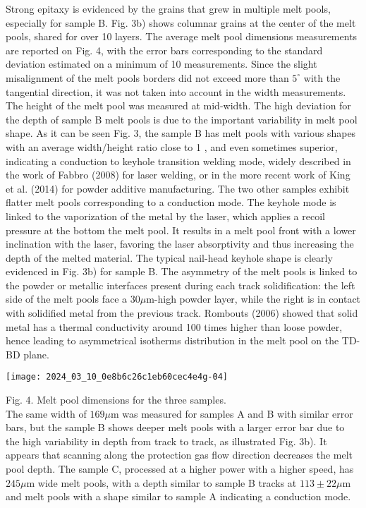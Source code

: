 \documentclass[10pt]{article}
\begin{document}
Strong epitaxy is evidenced by the grains that grew in multiple melt pools, especially for sample B. Fig. 3b) shows columnar grains at the center of the melt pools, shared for over 10 layers. The average melt pool dimensions measurements are reported on Fig. 4, with the error bars corresponding to the standard deviation estimated on a minimum of 10 measurements. Since the slight misalignment of the melt pools borders did not exceed more than $5^{\circ}$ with the tangential direction, it was not taken into account in the width measurements. The height of the melt pool was measured at mid-width. The high deviation for the depth of sample B melt pools is due to the important variability in melt pool shape. As it can be seen Fig. 3, the sample B has melt pools with various shapes with an average width/height ratio close to 1 , and even sometimes superior, indicating a conduction to keyhole transition welding mode, widely described in the work of Fabbro (2008) for laser welding, or in the more recent work of King et al. (2014) for powder additive manufacturing. The two other samples exhibit flatter melt pools corresponding to a conduction mode. The keyhole mode is linked to the vaporization of the metal by the laser, which applies a recoil pressure at the bottom the melt pool. It results in a melt pool front with a lower inclination with the laser, favoring the laser absorptivity and thus increasing the depth of the melted material. The typical nail-head keyhole shape is clearly evidenced in Fig. 3b) for sample B. The asymmetry of the melt pools is linked to the powder or metallic interfaces present during each track solidification: the left side of the melt pools face a $30 \mu \mathrm{m}$-high powder layer, while the right is in contact with solidified metal from the previous track. Rombouts (2006) showed that solid metal has a thermal conductivity around 100 times higher than loose powder, hence leading to asymmetrical isotherms distribution in the melt pool on the TD-BD plane.

\begin{center}
\texttt{[image: 2024\_03\_10\_0e8b6c26c1eb60cec4e4g-04]}
\end{center}

Fig. 4. Melt pool dimensions for the three samples.\\
The same width of $169 \mu \mathrm{m}$ was measured for samples A and B with similar error bars, but the sample B shows deeper melt pools with a larger error bar due to the high variability in depth from track to track, as illustrated Fig. 3b). It appears that scanning along the protection gas flow direction decreases the melt pool depth. The sample C, processed at a higher power with a higher speed, has $245 \mu \mathrm{m}$ wide melt pools, with a depth similar to sample B tracks at $113 \pm 22 \mu \mathrm{m}$ and melt pools with a shape similar to sample A indicating a conduction mode.
\end{document}
